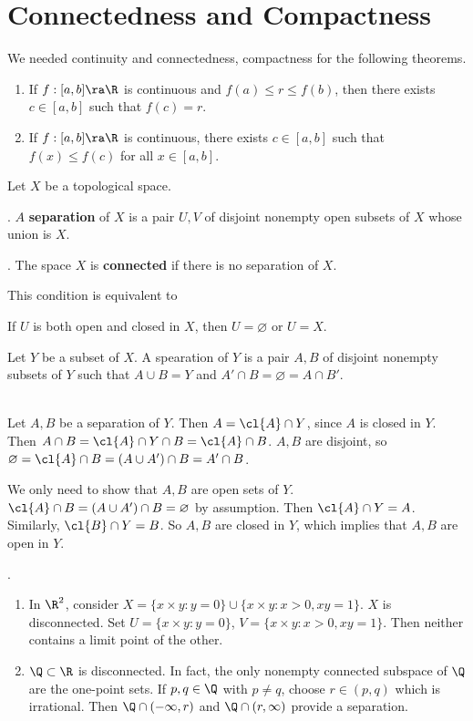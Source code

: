 \chapter{Connectedness and Compactness}

\recall We needed continuity and connectedness, compactness for the following theorems.
\begin{enumerate}
    \item {} If \(f : [a, b] \ra \R\) is continuous and \(f(a) \leq r \leq f(b)\), then there exists \(c \in [a, b]\) such that \(f(c) = r\).

    \item {} If \(f : [a, b] \ra \R\) is continuous, there exists \(c \in [a, b]\) such that \(f(x) \leq f(c)\) for all \(x \in [a, b]\).
\end{enumerate}


Let \(X\) be a topological space.

.  \(A\) \textbf{separation} of \(X\) is a pair \(U, V\) of disjoint nonempty open subsets of \(X\) whose union is \(X\).

.  The space \(X\) is \textbf{connected} if there is no separation of \(X\).

\rmk This condition is equivalent to
\begin{center}
    If \(U\) is both open and closed in \(X\), then \(U = \varnothing\) or \(U = X\).
\end{center}

 Let \(Y\) be a subset of \(X\). A spearation of \(Y\) is a pair \(A, B\) of disjoint nonempty subsets of \(Y\) such that \(A \cup B = Y\) and \(A' \cap B = \varnothing  = A \cap B'\).

\pf \\
\note{\mimp} Let \(A, B\) be a separation of \(Y\). Then \(A = \cl{A} \cap Y\), since \(A\) is closed in \(Y\). Then \(A \cap B = \cl{A} \cap Y \cap B = \cl{A} \cap B\). \(A, B\) are disjoint, so \(\varnothing = \cl{A} \cap B = (A \cup A') \cap B = A' \cap B\).

\note{\mimpd} We only need to show that \(A, B\) are open sets of \(Y\). \(\cl{A} \cap B = (A \cup A') \cap B = \varnothing\) by assumption. Then \(\cl{A} \cap Y = A\). Similarly, \(\cl{B} \cap Y = B\). So \(A, B\) are closed in \(Y\), which implies that \(A, B\) are open in \(Y\).

\ex.
\begin{enumerate}
    \item In \(\R^2\), consider \(X = \{x \times y : y = 0\} \cup \{x \times y : x > 0, xy = 1\}\). \(X\) is disconnected. Set \(U = \{x \times y : y = 0\}\), \(V = \{x \times y : x > 0, xy = 1\}\). Then neither contains a limit point of the other.
    \item \(\Q \subset \R\) is disconnected. In fact, the only nonempty connected subspace of \(\Q\) are the one-point sets. If \(p, q \in \Q\) with \(p \neq q\), choose \(r \in (p, q)\) which is irrational. Then \(\Q \cap (-\infty, r)\) and \(\Q \cap (r, \infty)\) provide a separation.
\end{enumerate}

